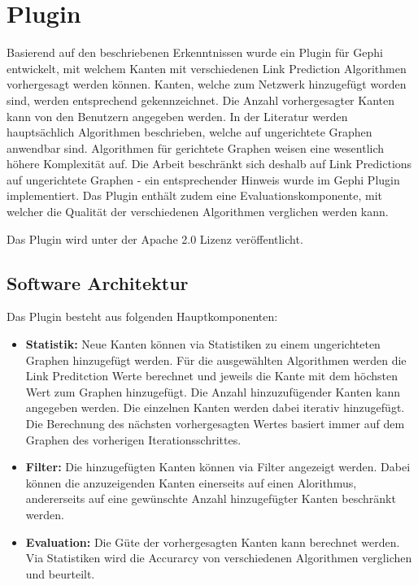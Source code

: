 \chapter{Plugin}

Basierend auf den beschriebenen Erkenntnissen wurde ein Plugin für Gephi entwickelt, mit welchem Kanten mit verschiedenen Link Prediction Algorithmen vorhergesagt werden können.
Kanten, welche zum Netzwerk hinzugefügt worden sind, werden entsprechend gekennzeichnet. Die Anzahl vorhergesagter Kanten kann von den Benutzern angegeben werden.
In der Literatur werden hauptsächlich Algorithmen beschrieben, welche auf ungerichtete Graphen anwendbar sind.
Algorithmen für gerichtete Graphen weisen eine wesentlich höhere Komplexität auf. Die Arbeit beschränkt sich deshalb auf Link Predictions auf ungerichtete Graphen -
ein entsprechender Hinweis wurde im Gephi Plugin implementiert. Das Plugin enthält zudem eine Evaluationskomponente, mit welcher die Qualität der verschiedenen Algorithmen verglichen werden kann.

Das Plugin wird unter der Apache 2.0 Lizenz veröffentlicht.

\section{Software Architektur}

Das Plugin besteht aus folgenden Hauptkomponenten:

\begin{itemize}
    \item \textbf{Statistik:} Neue Kanten können via Statistiken zu einem ungerichteten Graphen hinzugefügt werden. Für die ausgewählten Algorithmen werden die Link Preditction Werte berechnet und jeweils die Kante mit dem höchsten Wert zum Graphen hinzugefügt. Die Anzahl hinzuzufügender Kanten kann angegeben werden. Die einzelnen Kanten werden dabei iterativ hinzugefügt. Die Berechnung des nächsten vorhergesagten Wertes basiert immer auf dem Graphen des vorherigen Iterationsschrittes.
    \item \textbf{Filter:} Die hinzugefügten Kanten können via Filter angezeigt werden. Dabei können die anzuzeigenden Kanten einerseits auf einen Alorithmus, andererseits auf eine gewünschte Anzahl hinzugefügter Kanten beschränkt werden.
    \item \textbf{Evaluation:} Die Güte der vorhergesagten Kanten kann berechnet werden. Via Statistiken wird die Accurarcy von verschiedenen Algorithmen verglichen und beurteilt.
\end{itemize}

